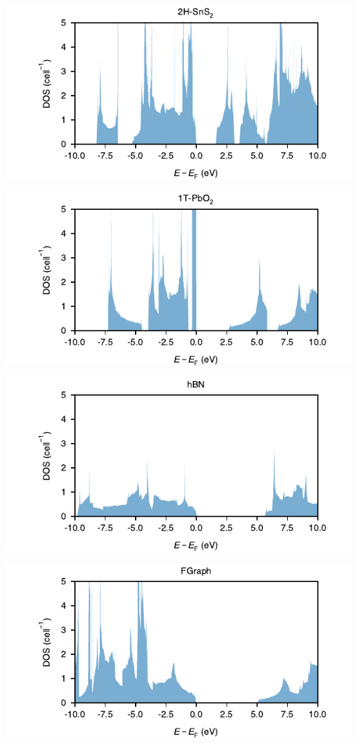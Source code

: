 \begin{center}
\includegraphics[width=.9\linewidth]{img/SI_figs/2H-SnS2-DOS.pdf}
\end{center}
\begin{center}
\includegraphics[width=.9\linewidth]{img/SI_figs/1T-PbO2-DOS.pdf}
\end{center}
\begin{center}
\includegraphics[width=.9\linewidth]{img/SI_figs/hBN-DOS.pdf}
\end{center}
\begin{center}
\includegraphics[width=.9\linewidth]{img/SI_figs/FGraph-DOS.pdf}
\end{center}

